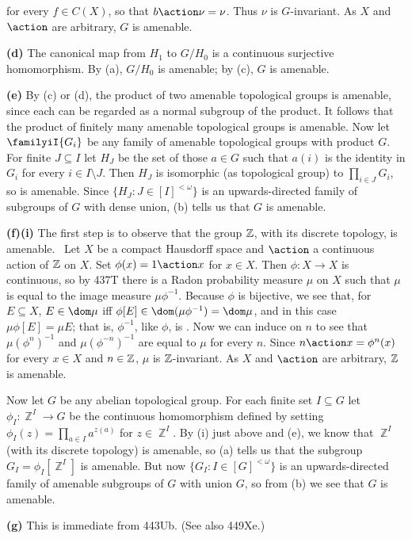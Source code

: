 {\noindent for every $f\in C(X)$, so that $b\action\nu=\nu$.   Thus
$\nu$
is $G$-invariant.   As $X$ and $\action$ are arbitrary, $G$ is
amenable.

\medskip

{\bf (d)} The canonical map from $H_1$ to $G/H_0$ is a continuous
surjective homomorphism.   By (a), $G/H_0$ is amenable;  by (c), $G$
is
amenable.

\medskip

{\bf (e)} By (c) or (d), the product of two amenable topological
groups
is amenable, since each can be regarded as a normal subgroup of the
product.   It follows that the product of finitely
many amenable topological groups is amenable.   Now let
$\familyiI{G_i}$
be any family of amenable topological groups with product $G$.   For
finite $J\subseteq I$ let $H_J$ be the set of those $a\in G$ such that
$a(i)$ is the identity in $G_i$ for every $i\in I\setminus J$.   Then
$H_J$ is isomorphic (as topological group) to $\prod_{i\in J}G_i$, so
is
amenable.   Since $\{H_J:J\in[I]^{<\omega}\}$ is an upwards-directed
family of subgroups of $G$ with dense union, (b) tells us that $G$ is
amenable.

\medskip

{\bf (f)(i)} The first step is to observe that the group $\Bbb Z$,
with
its discrete topology, is amenable.   \Prf\ Let $X$ be a compact
Hausdorff space and $\action$ a continuous action of $\Bbb Z$ on $X$.
Set $\phi(x)=1\action x$ for $x\in X$.   Then $\phi:X\to X$ is
continuous, so by
437T there is a Radon probability measure $\mu$ on $X$ such that
$\mu$ is equal to the image measure $\mu\phi^{-1}$.   Because $\phi$
is
bijective, we see that, for $E\subseteq X$,
$E\in\dom\mu$ iff $\phi[E]\in\dom(\mu\phi^{-1})=\dom\mu$, and in this
case $\mu\phi[E]=\mu E$;  that is, $\phi^{-1}$, like $\phi$, is \imp.
Now we can induce on $n$ to see
that $\mu(\phi^n)^{-1}$ and $\mu(\phi^{-n})^{-1}$ are equal to $\mu$
for
every $n$.   Since $n\action x=\phi^n(x)$ for every $x\in X$ and
$n\in\Bbb Z$, $\mu$ is $\Bbb Z$-invariant.
As $X$ and $\action$ are arbitrary, $\Bbb Z$ is amenable.\ \Qed

\medskip

 Now let $G$ be any abelian topological group.   For
each
finite set $I\subseteq G$ let $\phi_I:\BbbZ^I\to G$ be the continuous
homomorphism defined by setting $\phi_I(z)=\prod_{a\in I}a^{z(a)}$ for
$z\in\BbbZ^I$.   By (i) just above and (e), we know that $\BbbZ^I$
(with
its discrete topology) is amenable, so (a) tells us that the subgroup
$G_I=\phi_I[\BbbZ^I]$ is amenable.   But now
$\{G_I:I\in[G]^{<\omega}\}$
is an upwards-directed family of amenable subgroups of $G$ with union
$G$, so from (b) we see that $G$ is amenable.

\medskip

{\bf (g)} This is immediate from 443Ub.   (See also 449Xe.)
}%

